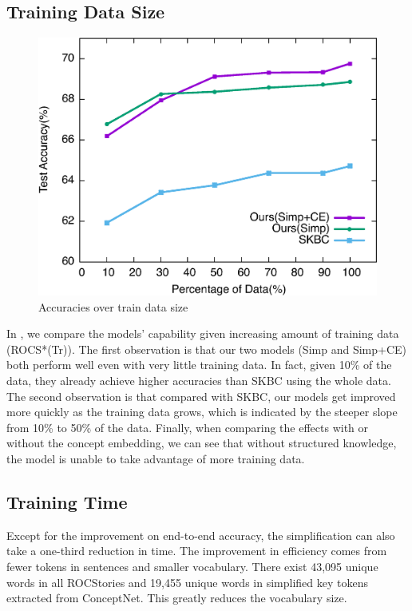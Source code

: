 \subsection{Training Data Size}
\label{sec:datasize}

\begin{figure}[th!]
\centering\includegraphics[width=0.7\columnwidth]{pictures/trend}
\caption{Accuracies over train data size}\label{fig:trend}
\end{figure}

In , we compare the models' capability given increasing
amount of training data (ROCS*(Tr)). The first observation is that our two models (Simp
and Simp+CE) both perform well even with very little training data. In fact,
given 10\% of the data, they already achieve higher accuracies than SKBC using
the whole data. The second observation is that compared with SKBC, our models
get improved more quickly as the training data grows, which is indicated by
the steeper slope from 10\% to 50\% of the data. 
Finally, when comparing the effects with or without the concept embedding, 
we can see that without structured knowledge,
the model is unable to take advantage of more training data. 

\subsection{Training Time}
\label{sec:time}
Except for the improvement on end-to-end accuracy, the simplification 
can also take a one-third reduction in time.
The improvement in efficiency comes from fewer tokens in sentences 
and smaller vocabulary.
There exist 43,095 unique words in all ROCStories and 
19,455 unique words in simplified key tokens extracted from ConceptNet. 
This greatly reduces the vocabulary size.
